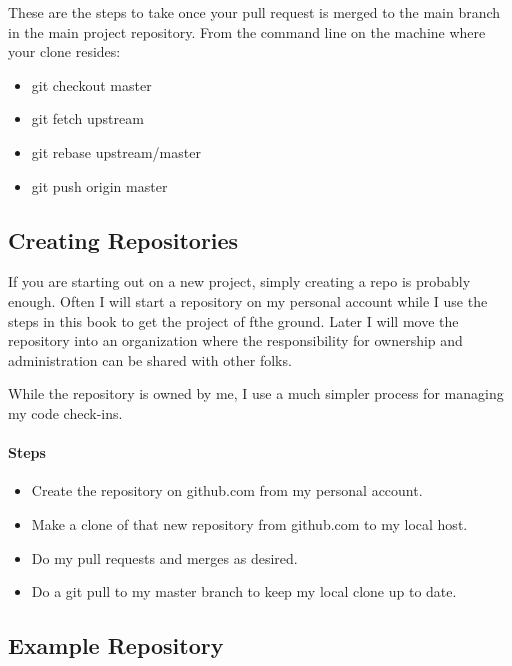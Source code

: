 These are the steps to take once your pull request is merged to the main
branch in the main project repository. From the command line on the
machine where your clone resides:

\begin{itemize}
      \item
            git checkout master
      \item
            git fetch upstream
      \item
            git rebase upstream/master
      \item
            git push origin master
\end{itemize}


\subsection{Creating Repositories}

\justify
If you are starting out on a new project, simply creating a repo is
probably enough. Often I will start a repository on my personal account
while I use the steps in this book to get the project of fthe ground.
Later I will move the repository into an organization where the
responsibility for ownership and administration can be shared with other
folks.

\justify
While the repository is owned by me, I use a much simpler process for
managing my code check-ins.

\hypertarget{steps-2}{%
      \paragraph{Steps}\label{steps-2}}

\begin{itemize}

      \item
            Create the repository on github.com from my personal account.
      \item
            Make a clone of that new repository from github.com to my local host.
      \item
            Do my pull requests and merges as desired.
      \item
            Do a git pull to my master branch to keep my local clone up to date.
\end{itemize}


\subsection{Example Repository}

